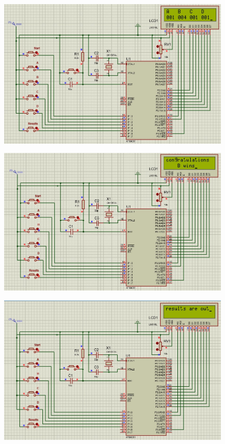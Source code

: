 \begin{figure}[H]  %
\begin{center}
\includegraphics[scale=0.50]{Chapter4/simulation7}
\end{center}
\end{figure}
\begin{figure}[H]  %
\begin{center}
\includegraphics[scale=0.50]{Chapter4/simulation8}
\end{center}
\end{figure}
\begin{figure}[H]  %
\begin{center}
\includegraphics[scale=0.50]{Chapter4/simulation9}
\end{center}
\end{figure}

